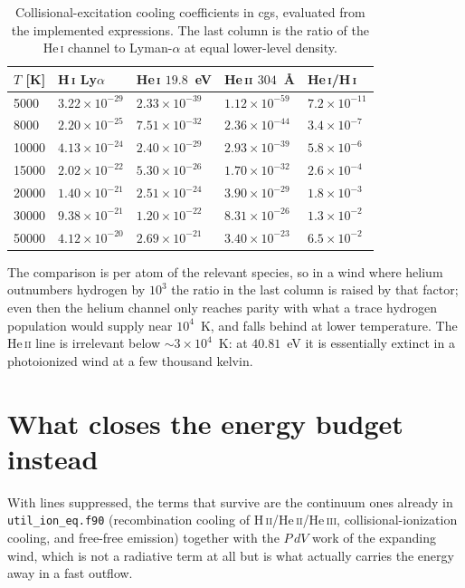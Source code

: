 \documentclass[english,a4paper]{my_memo}
\begin{document}
\begin{table}[h]
\centering
\begin{tabular}{lllll}
\toprule
$T$ [K] & H\,\textsc{i} Ly$\alpha$ & He\,\textsc{i} $19.8$~eV
        & He\,\textsc{ii} $304$~\AA{} & He\,\textsc{i}/H\,\textsc{i} \\
\midrule
5000 & $3.22\times10^{-29}$ & $2.33\times10^{-39}$ & $1.12\times10^{-59}$ & $7.2\times10^{-11}$ \\
8000 & $2.20\times10^{-25}$ & $7.51\times10^{-32}$ & $2.36\times10^{-44}$ & $3.4\times10^{-7}$ \\
10000 & $4.13\times10^{-24}$ & $2.40\times10^{-29}$ & $2.93\times10^{-39}$ & $5.8\times10^{-6}$ \\
15000 & $2.02\times10^{-22}$ & $5.30\times10^{-26}$ & $1.70\times10^{-32}$ & $2.6\times10^{-4}$ \\
20000 & $1.40\times10^{-21}$ & $2.51\times10^{-24}$ & $3.90\times10^{-29}$ & $1.8\times10^{-3}$ \\
30000 & $9.38\times10^{-21}$ & $1.20\times10^{-22}$ & $8.31\times10^{-26}$ & $1.3\times10^{-2}$ \\
50000 & $4.12\times10^{-20}$ & $2.69\times10^{-21}$ & $3.40\times10^{-23}$ & $6.5\times10^{-2}$ \\
\bottomrule
\end{tabular}
\caption{Collisional-excitation cooling coefficients in cgs, evaluated from
the implemented expressions. The last column is the ratio of the
He\,\textsc{i} channel to Lyman-$\alpha$ at equal lower-level density.}
\end{table}

The comparison is per atom of the relevant species, so in a wind where
helium outnumbers hydrogen by $10^3$ the ratio in the last column is raised
by that factor; even then the helium channel only reaches parity with what a
trace hydrogen population would supply near $10^4$~K, and falls behind at
lower temperature. The He\,\textsc{ii} line is irrelevant below
$\sim 3\times10^4$~K: at $40.81$~eV it is essentially extinct in a
photoionized wind at a few thousand kelvin.

\section{What closes the energy budget instead}

With lines suppressed, the terms that survive are the continuum ones already
in \texttt{util\_ion\_eq.f90} (recombination cooling of
H\,\textsc{ii}/He\,\textsc{ii}/He\,\textsc{iii}, collisional-ionization
cooling, and free-free emission) together with the $P\,dV$ work of the
expanding wind, which is not a radiative term at all but is what actually
carries the energy away in a fast outflow.
\end{document}
